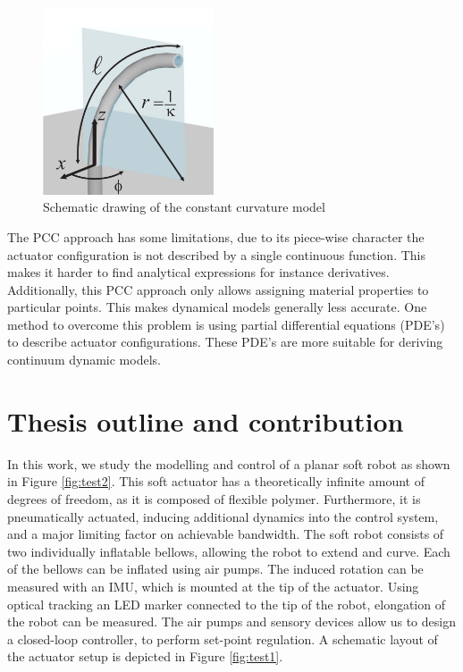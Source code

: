 \begin{figure}[H]
    \centering
    \includegraphics[width = 0.45\textwidth]{Figures/Chapter2/ccapproach.png}
    \caption{Schematic drawing of the constant curvature model \cite{ccapproach} }
    \label{fig2:ccapproach}
\end{figure}

The PCC approach has some limitations, due to its piece-wise character the actuator configuration is not described by a single continuous function. This makes it harder to find analytical expressions for instance derivatives. Additionally, this PCC approach only allows assigning material properties to particular points. This makes dynamical models generally less accurate. One method to overcome this problem is using partial differential equations (PDE's) to describe actuator configurations. These PDE's are more suitable for deriving continuum dynamic models. 



\section*{Thesis outline and contribution}

In this work, we study the modelling and control of a planar soft robot as shown in Figure \ref{fig:test2}. This soft actuator has a theoretically infinite amount of degrees of freedom, as it is composed of flexible polymer. Furthermore, it is pneumatically actuated, inducing additional dynamics into the control system, and a major limiting factor on achievable bandwidth. The soft robot consists of two individually inflatable bellows, allowing the robot to extend and curve. Each of the bellows can be inflated using air pumps. The induced rotation can be measured with an IMU, which is mounted at the tip of the actuator. Using optical tracking an LED marker connected to the tip of the robot, elongation of the robot can be measured. The air pumps and sensory devices allow us to design a closed-loop controller, to perform set-point regulation. A schematic layout of the actuator setup is depicted in Figure \ref{fig:test1}.

